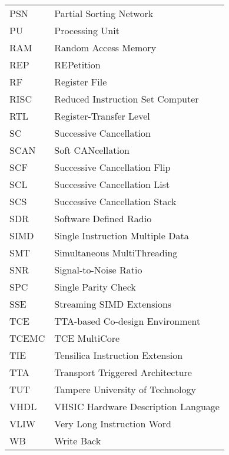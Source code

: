 \begin{center}
\begin{longtable}{ p{}  p{} }
PSN       & Partial Sorting Network                                \\
PU        & Processing Unit                                        \\
RAM       & Random Access Memory                                   \\
REP       & REPetition                                             \\
RF        & Register File                                          \\
RISC      & Reduced Instruction Set Computer                       \\
RTL       & Register-Transfer Level                                \\
SC        & Successive Cancellation                                \\
SCAN      & Soft CANcellation                                      \\
SCF       & Successive Cancellation Flip                           \\
SCL       & Successive Cancellation List                           \\
SCS       & Successive Cancellation Stack                          \\
SDR       & Software Defined Radio                                 \\
SIMD      & Single Instruction Multiple Data                       \\
SMT       & Simultaneous MultiThreading                            \\
SNR       & Signal-to-Noise Ratio                                  \\
SPC       & Single Parity Check                                    \\
SSE       & Streaming SIMD Extensions                              \\
TCE       & TTA-based Co-design Environment                        \\
TCEMC     & TCE MultiCore                                          \\
TIE       & Tensilica Instruction Extension                        \\
TTA       & Transport Triggered Architecture                       \\
TUT       & Tampere University of Technology                       \\
VHDL      & VHSIC Hardware Description Language                    \\
VLIW      & Very Long Instruction Word                             \\
WB        & Write Back                                             \\
\end{longtable}

\end{center}

